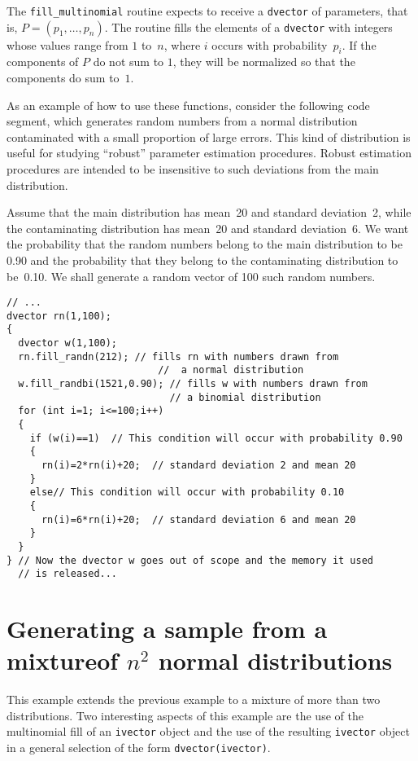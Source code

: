 \documentclass{admbmanual}
\begin{document}
The \texttt{fill\_multinomial} routine expects to receive a \texttt{dvector} of
parameters, that is, $P=(p_1,\ldots,p_n)$. The routine fills the elements of a
\texttt{dvector} with integers whose values range from $1$ to~$n$, where $i$
occurs with probability~$p_i$. If the components of $P$ do not sum to $1$, they
will be normalized so that the components do sum to~$1$.

As an example of how to use these functions, consider the following code
segment, which generates random numbers from a normal distribution contaminated
with a small proportion of large errors. This kind of distribution is useful for
studying ``robust'' parameter estimation procedures. Robust estimation
procedures are intended to be insensitive to such deviations from the main
distribution.

Assume that the main distribution has mean~20 and standard deviation~2, while
the contaminating distribution has mean~20 and standard deviation~6. We want the
probability that the random numbers belong to the main distribution to be 0.90
and the probability that they belong to the contaminating distribution to
be~0.10. We shall generate a random vector of 100 such random numbers.
\begin{lstlisting}
// ...
dvector rn(1,100);
{
  dvector w(1,100);
  rn.fill_randn(212); // fills rn with numbers drawn from
                          //  a normal distribution
  w.fill_randbi(1521,0.90); // fills w with numbers drawn from
                            // a binomial distribution
  for (int i=1; i<=100;i++)
  {
    if (w(i)==1)  // This condition will occur with probability 0.90
    {
      rn(i)=2*rn(i)+20;  // standard deviation 2 and mean 20
    }
    else// This condition will occur with probability 0.10
    {
      rn(i)=6*rn(i)+20;  // standard deviation 6 and mean 20
    }
  }
} // Now the dvector w goes out of scope and the memory it used
  // is released...
\end{lstlisting}

\section{Generating a sample from a mixture\br of $n^2$ normal distributions}

This example extends the previous example to a mixture of more than two
distributions. Two interesting aspects of this example are the use of the
multinomial fill of an \texttt{ivector} object and the use of the resulting
\texttt{ivector} object in a general selection of the form
\texttt{dvector(ivector)}.
\end{document}
